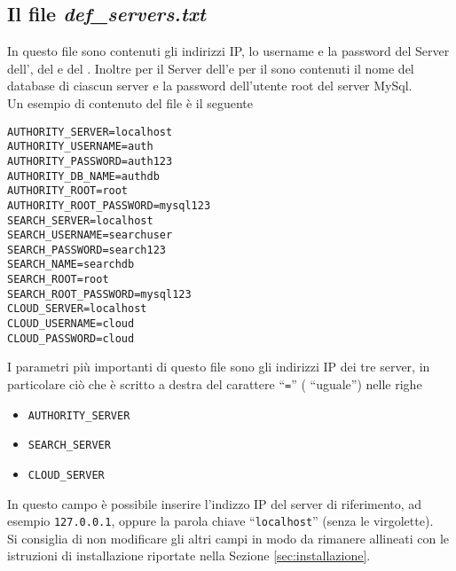 \documentclass[a4paper,twoside,10pt,openany]{scrbook}
\begin{document}
\subsection{Il file \emph{def\_servers.txt}}\label{sec:file_servers}
In questo file sono contenuti gli indirizzi IP, lo username e la password del Server dell'\auth, del \sr e del \sa. Inoltre per il Server dell'\auth e per il \sr sono contenuti il nome del database di ciascun server e la password dell'utente root del server MySql.\\
Un esempio di contenuto del file è il seguente
\begin{verbatim}
AUTHORITY_SERVER=localhost
AUTHORITY_USERNAME=auth
AUTHORITY_PASSWORD=auth123
AUTHORITY_DB_NAME=authdb
AUTHORITY_ROOT=root
AUTHORITY_ROOT_PASSWORD=mysql123
SEARCH_SERVER=localhost
SEARCH_USERNAME=searchuser
SEARCH_PASSWORD=search123
SEARCH_NAME=searchdb
SEARCH_ROOT=root
SEARCH_ROOT_PASSWORD=mysql123
CLOUD_SERVER=localhost
CLOUD_USERNAME=cloud
CLOUD_PASSWORD=cloud
\end{verbatim}
I parametri più importanti di questo file sono gli indirizzi IP dei tre server, in particolare ciò che è scritto a destra del carattere ``\texttt{=}'' ( ``uguale'') nelle righe 
\begin{itemize}
 \item \texttt{AUTHORITY\_SERVER}
 \item \texttt{SEARCH\_SERVER}
 \item \texttt{CLOUD\_SERVER}
\end{itemize}
In questo campo è possibile inserire l'indizzo IP del server di riferimento, ad esempio \texttt{127.0.0.1}, oppure la parola chiave ``\texttt{localhost}'' (senza le virgolette).\\
Si consiglia di non modificare gli altri campi in modo da rimanere allineati con le istruzioni di installazione riportate nella Sezione \ref{sec:installazione}.
%
\end{document}
